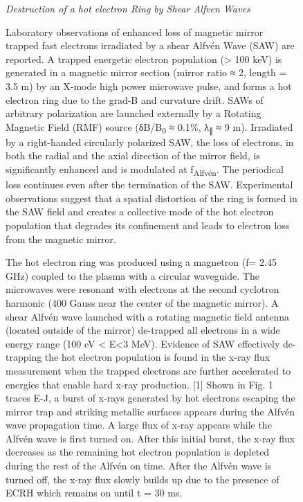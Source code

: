 \documentclass[11pt]{article}
\begin{document}
\begin{description}
\begin{figure}[!htbp]
\emph{Destruction of a hot electron Ring by Shear Alfven Waves}

Laboratory observations of enhanced loss of magnetic mirror trapped fast
electrons irradiated by a shear Alfvén Wave (SAW) are reported. A
trapped energetic electron population (\textgreater{} 100 keV) is
generated in a magnetic mirror section (mirror ratio ≈ 2, length = 3.5
m) by an X-mode high power microwave pulse, and forms a hot electron
ring due to the grad-B and curvature drift. SAWs of arbitrary
polarization are launched externally by a Rotating Magnetic Field (RMF)
source (δB/B\textsubscript{0} ≈ 0.1\%, λ\textsubscript{∥} ≈ 9 m).
Irradiated by a right-handed circularly polarized SAW, the loss of
electrons, in both the radial and the axial direction of the mirror
field, is significantly enhanced and is modulated at
f\textsubscript{Alfvén}. The periodical loss continues even after the
termination of the SAW. Experimental observations suggest that a spatial
distortion of the ring is formed in the SAW field and creates a
collective mode of the hot electron population that degrades its
confinement and leads to electron loss from the magnetic mirror.

The hot electron ring was produced using a magnetron (f= 2.45 GHz)
coupled to the plasma with a circular waveguide. The microwaves were
resonant with electrons at the second cyclotron harmonic (400 Gauss near
the center of the magnetic mirror). A shear Alfvén wave launched with a
rotating magnetic field antenna (located outside of the mirror)
de-trapped all electrons in a wide energy range (100 eV \textless{}
E\textless{}3 MeV). Evidence of SAW effectively de-trapping the hot
electron population is found in the x-ray flux measurement when the
trapped electrons are further accelerated to energies that enable hard
x-ray production. {[}1{]} Shown in Fig. 1 traces E-J, a burst of x-rays
generated by hot electrons escaping the mirror trap and striking
metallic surfaces appears during the Alfvén wave propagation time. A
large flux of x-ray appears while the Alfvén wave is first turned on.
After this initial burst, the x-ray flux decreases as the remaining hot
electron population is depleted during the rest of the Alfvén on time.
After the Alfvén wave is turned off, the x-ray flux slowly builds up due
to the presence of ECRH which remains on until t = 30 ms.


\end{figure}
\end{description}
\end{document}
